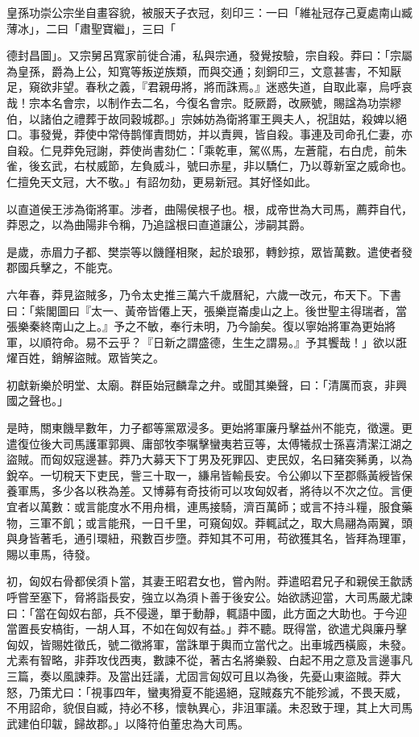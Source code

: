 \begin{pinyinscope}
皇孫功崇公宗坐自畫容貌，被服天子衣冠，刻印三：一曰「維祉冠存己夏處南山臧薄冰」，二曰「肅聖寶繼」，三曰「

德封昌圖」。又宗舅呂寬家前徙合浦，私與宗通，發覺按驗，宗自殺。莽曰：「宗屬為皇孫，爵為上公，知寬等叛逆族類，而與交通；刻銅印三，文意甚害，不知厭足，窺欲非望。春秋之義，『君親毋將，將而誅焉。』迷惑失道，自取此辜，烏呼哀哉！宗本名會宗，以制作去二名，今復名會宗。貶厥爵，改厥號，賜諡為功崇繆伯，以諸伯之禮葬于故同穀城郡。」宗姊妨為衛將軍王興夫人，祝詛姑，殺婢以絕口。事發覺，莽使中常侍鹊惲責問妨，并以責興，皆自殺。事連及司命孔仁妻，亦自殺。仁見莽免冠謝，莽使尚書劾仁：「乘乾車，駕巛馬，左蒼龍，右白虎，前朱雀，後玄武，右杖威節，左負威斗，號曰赤星，非以驕仁，乃以尊新室之威命也。仁擅免天文冠，大不敬。」有詔勿劾，更易新冠。其好怪如此。

以直道侯王涉為衛將軍。涉者，曲陽侯根子也。根，成帝世為大司馬，薦莽自代，莽恩之，以為曲陽非令稱，乃追諡根曰直道讓公，涉嗣其爵。

是歲，赤眉力子都、樊崇等以饑饉相聚，起於琅邪，轉鈔掠，眾皆萬數。遣使者發郡國兵擊之，不能克。

六年春，莽見盜賊多，乃令太史推三萬六千歲曆紀，六歲一改元，布天下。下書曰：「紫閣圖曰『太一、黃帝皆僊上天，張樂崑崙虔山之上。後世聖主得瑞者，當張樂秦終南山之上。』予之不敏，奉行未明，乃今諭矣。復以寧始將軍為更始將軍，以順符命。易不云乎？『日新之謂盛德，生生之謂易。』予其饗哉！」欲以誑燿百姓，銷解盜賊。眾皆笑之。

初獻新樂於明堂、太廟。群臣始冠麟韋之弁。或聞其樂聲，曰：「清厲而哀，非興國之聲也。」

是時，關東饑旱數年，力子都等黨眾浸多。更始將軍廉丹擊益州不能克，徵還。更遣復位後大司馬護軍郭興、庸部牧李嘱擊蠻夷若豆等，太傅犧叔士孫喜清潔江湖之盜賊。而匈奴寇邊甚。莽乃大募天下丁男及死罪囚、吏民奴，名曰豬突豨勇，以為銳卒。一切稅天下吏民，訾三十取一，縑帛皆輸長安。令公卿以下至郡縣黃綬皆保養軍馬，多少各以秩為差。又博募有奇技術可以攻匈奴者，將待以不次之位。言便宜者以萬數：或言能度水不用舟楫，連馬接騎，濟百萬師；或言不持斗糧，服食藥物，三軍不飢；或言能飛，一日千里，可窺匈奴。莽輒試之，取大鳥翮為兩翼，頭與身皆著毛，通引環紐，飛數百步墮。莽知其不可用，苟欲獲其名，皆拜為理軍，賜以車馬，待發。

初，匈奴右骨都侯須卜當，其妻王昭君女也，嘗內附。莽遣昭君兄子和親侯王歙誘呼嘗至塞下，脅將詣長安，強立以為須卜善于後安公。始欲誘迎當，大司馬嚴尤諫曰：「當在匈奴右部，兵不侵邊，單于動靜，輒語中國，此方面之大助也。于今迎當置長安槁街，一胡人耳，不如在匈奴有益。」莽不聽。既得當，欲遣尤與廉丹擊匈奴，皆賜姓徵氏，號二徵將軍，當誅單于輿而立當代之。出車城西橫廄，未發。尤素有智略，非莽攻伐西夷，數諫不從，著古名將樂毅、白起不用之意及言邊事凡三篇，奏以風諫莽。及當出廷議，尤固言匈奴可且以為後，先憂山東盜賊。莽大怒，乃策尤曰：「視事四年，蠻夷猾夏不能遏絕，寇賊姦宄不能殄滅，不畏天威，不用詔命，貌佷自臧，持必不移，懷執異心，非沮軍議。未忍致于理，其上大司馬武建伯印韍，歸故郡。」以降符伯董忠為大司馬。


\end{pinyinscope}
